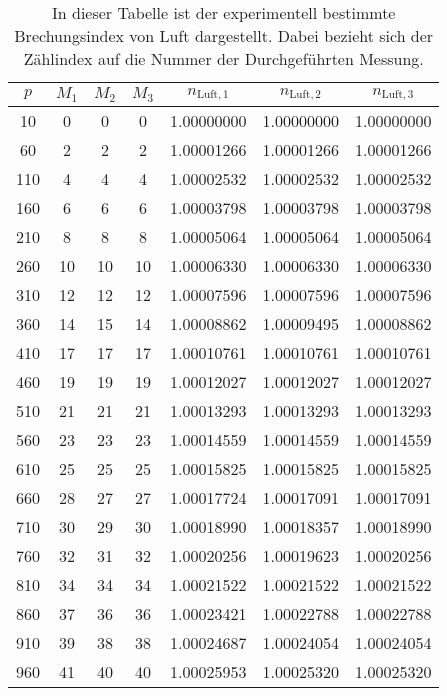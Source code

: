 \begin{table}[htbp] 
  \centering 
  \begin{tabular}{c c c c c c c} 
      \toprule $p$ & $M_1$ & $M_2$ & $M_3$ & $n_{\mathrm{Luft},1}$ & $n_{\mathrm{Luft},2}$ & $n_{\mathrm{Luft},3}$ \\ 
      \midrule 
       10 &  0 &  0 &  0 & 1.00000000 & 1.00000000 & 1.00000000 \\
       60 &  2 &  2 &  2 & 1.00001266 & 1.00001266 & 1.00001266 \\
      110 &  4 &  4 &  4 & 1.00002532 & 1.00002532 & 1.00002532 \\
      160 &  6 &  6 &  6 & 1.00003798 & 1.00003798 & 1.00003798 \\
      210 &  8 &  8 &  8 & 1.00005064 & 1.00005064 & 1.00005064 \\
      260 & 10 & 10 & 10 & 1.00006330 & 1.00006330 & 1.00006330 \\
      310 & 12 & 12 & 12 & 1.00007596 & 1.00007596 & 1.00007596 \\
      360 & 14 & 15 & 14 & 1.00008862 & 1.00009495 & 1.00008862 \\
      410 & 17 & 17 & 17 & 1.00010761 & 1.00010761 & 1.00010761 \\
      460 & 19 & 19 & 19 & 1.00012027 & 1.00012027 & 1.00012027 \\
      510 & 21 & 21 & 21 & 1.00013293 & 1.00013293 & 1.00013293 \\
      560 & 23 & 23 & 23 & 1.00014559 & 1.00014559 & 1.00014559 \\
      610 & 25 & 25 & 25 & 1.00015825 & 1.00015825 & 1.00015825 \\
      660 & 28 & 27 & 27 & 1.00017724 & 1.00017091 & 1.00017091 \\
      710 & 30 & 29 & 30 & 1.00018990 & 1.00018357 & 1.00018990 \\
      760 & 32 & 31 & 32 & 1.00020256 & 1.00019623 & 1.00020256 \\
      810 & 34 & 34 & 34 & 1.00021522 & 1.00021522 & 1.00021522 \\
      860 & 37 & 36 & 36 & 1.00023421 & 1.00022788 & 1.00022788 \\
      910 & 39 & 38 & 38 & 1.00024687 & 1.00024054 & 1.00024054 \\
      960 & 41 & 40 & 40 & 1.00025953 & 1.00025320 & 1.00025320 \\
      \bottomrule 
  \end{tabular} 
  \caption[Tabelle]{In dieser Tabelle ist der experimentell bestimmte Brechungsindex von Luft dargestellt. Dabei bezieht sich der Zählindex auf die Nummer der Durchgeführten Messung.} 
  \label{tab:n_luft} 
\end{table}


